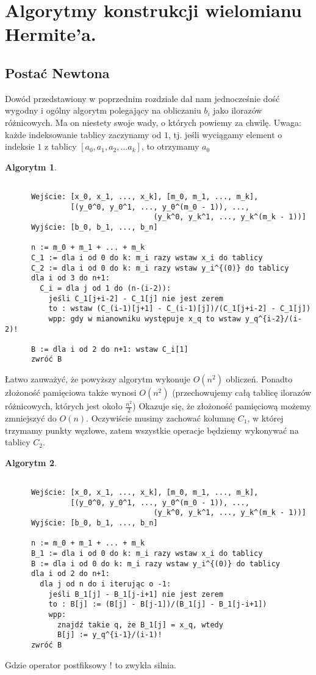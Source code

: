 \documentclass[10pt,wide]{mwart}
\theoremstyle{definition}
\newtheorem{alg}{Algorytm}
\begin{document}
 \section{Algorytmy konstrukcji wielomianu Hermite'a.}
 \subsection{Postać Newtona}
 Dowód przedstawiony w poprzednim rozdziale dał nam jednocześnie dość wygodny i ogólny algorytm polegający na obliczaniu \(b_i\) jako ilorazów różnicowych.
 Ma on niestety swoje wady, o których powiemy za chwilę.
 Uwaga: każde indeksowanie tablicy zaczynamy od \(1\), tj. jeśli wyciągamy element o indeksie \(1\) z tablicy \([a_0, a_1, a_2, ... a_k]\), to otrzymamy \(a_0\)
\begin{alg}
  \begin{verbatim}

      Wejście: [x_0, x_1, ..., x_k], [m_0, m_1, ..., m_k],
               [(y_0^0, y_0^1, ..., y_0^(m_0 - 1)), ...,
                                  (y_k^0, y_k^1, ..., y_k^(m_k - 1))]
      Wyjście: [b_0, b_1, ..., b_n]

      n := m_0 + m_1 + ... + m_k
      C_1 := dla i od 0 do k: m_i razy wstaw x_i do tablicy
      C_2 := dla i od 0 do k: m_i razy wstaw y_i^{(0)} do tablicy
      dla i od 3 do n+1:
        C_i = dla j od 1 do (n-(i-2)):
          jeśli C_1[j+i-2] - C_1[j] nie jest zerem
          to : wstaw (C_(i-1)[j+1] - C_(i-1)[j])/(C_1[j+i-2] - C_1[j])
          wpp: gdy w mianowniku występuje x_q to wstaw y_q^{i-2}/(i-2)!

      B := dla i od 2 do n+1: wstaw C_i[1]
      zwróć B
\end{verbatim}
\end{alg}
Łatwo zauważyć, że powyższy algorytm wykonuje \(O(n^2)\) obliczeń. Ponadto złożoność pamięciowa także wynosi \(O(n^2)\) (przechowujemy całą tablicę ilorazów różnicowych, których jest około \(\frac{n^2}{2}\))
Okazuje się, że złożoność pamięciową możemy zmniejszyć do \(O(n)\). Oczywiście musimy zachować kolumnę \(C_1\), w której trzymamy punkty węzłowe, zatem wszystkie operacje będziemy wykonywać na tablicy \(C_2\).
\begin{alg}
  \begin{verbatim}

      Wejście: [x_0, x_1, ..., x_k], [m_0, m_1, ..., m_k],
               [(y_0^0, y_0^1, ..., y_0^(m_0 - 1)), ...,
                                  (y_k^0, y_k^1, ..., y_k^(m_k - 1))]
      Wyjście: [b_0, b_1, ..., b_n]

      n := m_0 + m_1 + ... + m_k
      B_1 := dla i od 0 do k: m_i razy wstaw x_i do tablicy
      B := dla i od 0 do k: m_i razy wstaw y_i^{(0)} do tablicy
      dla i od 2 do n+1:
        dla j od n do i iterując o -1:
          jeśli B_1[j] - B_1[j-i+1] nie jest zerem
          to : B[j] := (B[j] - B[j-1])/(B_1[j] - B_1[j-i+1])
          wpp:
            znajdź takie q, że B_1[j] = x_q, wtedy
            B[j] := y_q^{i-1}/(i-1)!
      zwróć B
\end{verbatim}
\end{alg}
Gdzie operator postfiksowy ! to zwykła silnia.
\end{document}
